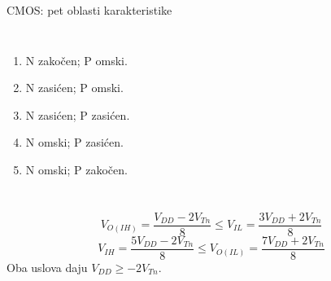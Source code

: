 \begin{frame}[label=09_2-s037]{CMOS: pet oblasti karakteristike}
\begin{columns}[T,onlytextwidth]\centering \hspace{5mm}\centering {}\begin{enumerate}
\item N zakočen; P omski.
\item N zasićen; P omski.
\item N zasićen; P zasićen.
\item N omski; P zasićen.
\item N omski; P zakočen.
\end{enumerate}\end{columns}\[V_{O(IH)}=\frac{V_{DD}-2V_{Tn}}8\le V_{IL}=\frac{3V_{DD}+2V_{Tn}}8\]
\[V_{IH}=\frac{5V_{DD}-2V_{Tn}}8\le V_{O(IL)}=\frac{7V_{DD}+2V_{Tn}}8\]
\centering Oba uslova daju $V_{DD}\geq-2V_{Tn}$.
\end{frame}
